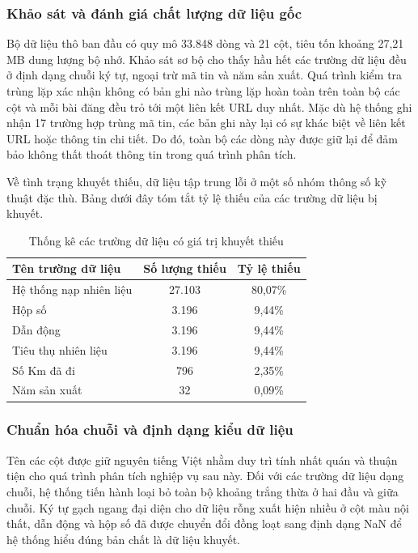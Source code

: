 \subsubsection{Khảo sát và đánh giá chất lượng dữ liệu gốc}
Bộ dữ liệu thô ban đầu có quy mô 33.848 dòng và 21 cột, tiêu tốn khoảng 27,21 MB dung lượng bộ nhớ. Khảo sát sơ bộ cho thấy hầu hết các trường dữ liệu đều ở định dạng chuỗi ký tự, ngoại trừ mã tin và năm sản xuất. Quá trình kiểm tra trùng lặp xác nhận không có bản ghi nào trùng lặp hoàn toàn trên toàn bộ các cột và mỗi bài đăng đều trỏ tới một liên kết URL duy nhất. Mặc dù hệ thống ghi nhận 17 trường hợp trùng mã tin, các bản ghi này lại có sự khác biệt về liên kết URL hoặc thông tin chi tiết. Do đó, toàn bộ các dòng này được giữ lại để đảm bảo không thất thoát thông tin trong quá trình phân tích.

Về tình trạng khuyết thiếu, dữ liệu tập trung lỗi ở một số nhóm thông số kỹ thuật đặc thù. Bảng dưới đây tóm tắt tỷ lệ thiếu của các trường dữ liệu bị khuyết.

\begin{table}[htpb]
\centering
\caption{Thống kê các trường dữ liệu có giá trị khuyết thiếu}
\begin{tabular}{l c c}
\textbf{Tên trường dữ liệu} & \textbf{Số lượng thiếu} & \textbf{Tỷ lệ thiếu} \\ \hline
Hệ thống nạp nhiên liệu & 27.103 & 80,07\% \\
Hộp số & 3.196 & 9,44\% \\
Dẫn động & 3.196 & 9,44\% \\
Tiêu thụ nhiên liệu & 3.196 & 9,44\% \\
Số Km đã đi & 796 & 2,35\% \\
Năm sản xuất & 32 & 0,09\% \\
\end{tabular}
\end{table}

\subsubsection{Chuẩn hóa chuỗi và định dạng kiểu dữ liệu}
Tên các cột được giữ nguyên tiếng Việt nhằm duy trì tính nhất quán và thuận tiện cho quá trình phân tích nghiệp vụ sau này. Đối với các trường dữ liệu dạng chuỗi, hệ thống tiến hành loại bỏ toàn bộ khoảng trắng thừa ở hai đầu và giữa chuỗi. Ký tự gạch ngang đại diện cho dữ liệu rỗng xuất hiện nhiều ở cột màu nội thất, dẫn động và hộp số đã được chuyển đổi đồng loạt sang định dạng NaN để hệ thống hiểu đúng bản chất là dữ liệu khuyết.

